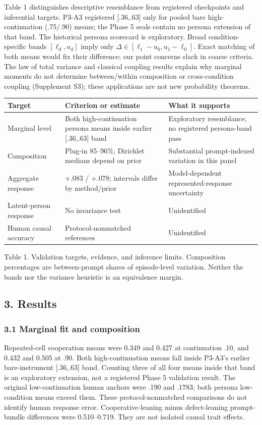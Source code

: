 \documentclass[11pt]{article}
\begin{document}
Table 1 distinguishes descriptive resemblance from registered
checkpoints and inferential targets. P3-A3 registered {[}.36,.63{]} only
for pooled bare high-continuation (.75/.90) means; the Phase 5 seals
contain no persona extension of that band. The historical persona
scorecard is exploratory. Broad condition-specific bands
\([\ell_d,u_d]\) imply only \(\Delta\in[\ell_1-u_0,u_1-\ell_0]\). Exact
matching of both means would fix their difference; our point concerns
slack in coarse criteria. The law of total variance and classical
coupling results explain why marginal moments do not determine
between/within composition or cross-condition coupling (Supplement S3);
these applications are not new probability theorems.

\begin{tabular}{p{.17\linewidth}p{.37\linewidth}p{.35\linewidth}}\toprule
Target & Criterion or estimate & What it supports \\ \midrule
Marginal level & Both high-continuation persona means inside earlier [.36,.63] band & Exploratory resemblance, no registered persona-band pass \\
Composition & Plug-in 85–96\%; Dirichlet medians depend on prior & Substantial prompt-indexed variation in this panel \\
Aggregate response & +.083 / +.078; intervals differ by method/prior & Model-dependent represented-response uncertainty \\
Latent-person response & No invariance test & Unidentified \\
Human causal accuracy & Protocol-nonmatched references & Unidentified \\
\bottomrule\end{tabular}

Table 1. Validation targets, evidence, and inference limits. Composition
percentages are between-prompt shares of episode-level variation.
Neither the bands nor the variance heuristic is an equivalence margin.

\subsection{3. Results}\label{results}

\subsubsection{3.1 Marginal fit and
composition}\label{marginal-fit-and-composition}

Repeated-cell cooperation means were 0.349 and 0.427 at continuation
.10, and 0.432 and 0.505 at .90. Both high-continuation means fall
inside P3-A3's earlier bare-instrument {[}.36,.63{]} band. Counting
three of all four means inside that band is an exploratory extension,
not a registered Phase 5 validation result. The original
low-continuation human anchors were .190 and .1783; both persona
low-condition means exceed them. These protocol-nonmatched comparisons
do not identify human response error. Cooperative-leaning minus
defect-leaning prompt-bundle differences were 0.510--0.719. They are not
isolated causal trait effects.
\end{document}
